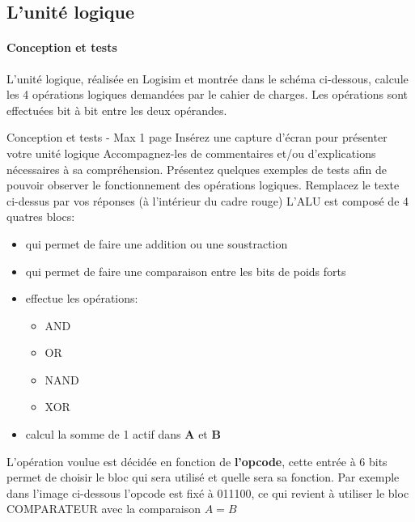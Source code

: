\documentclass[a4paper]{article}
\begin{document}
\subsection{L'unité logique}
\label{logique}

\paragraph{Conception et tests}
L’unité logique, réalisée en Logisim et montrée dans le schéma ci-dessous, calcule les 4 opérations logiques demandées par le cahier de charges. Les opérations sont effectuées bit à bit entre les deux opérandes.

\begin{tcolorbox}[colframe=Monokaimagenta,colback=white]
Conception et tests - Max 1 page 
Insérez une capture d’écran pour présenter votre unité logique
Accompagnez-les de commentaires et/ou d’explications nécessaires à sa compréhension.
Présentez quelques exemples de tests  afin de pouvoir observer le fonctionnement des opérations logiques.
Remplacez le texte ci-dessus par vos réponses (à l’intérieur du cadre rouge)
L'ALU est composé de 4 quatres blocs:
\begin{itemize}

\item    {} qui permet de faire une addition ou une soustraction
\item    {} qui permet de faire une comparaison entre les bits de poids forts
\item    {} effectue les opérations:
    \begin{itemize}
        \item     AND
        \item     OR
        \item     NAND
        \item     XOR
    \end{itemize}
\item    {} calcul la somme de 1 actif dans \textbf{A} et \textbf{B}

\end{itemize}
\smallskip
L'opération voulue est décidée en fonction de \textbf{l'opcode}, cette entrée à 6 bits permet de choisir le bloc qui sera utilisé et quelle sera sa fonction. Par exemple dans l'image ci-dessous l'opcode est fixé à 011100, ce qui revient à utiliser le bloc COMPARATEUR avec la comparaison $A=B$\\


\end{tcolorbox}
\end{document}
